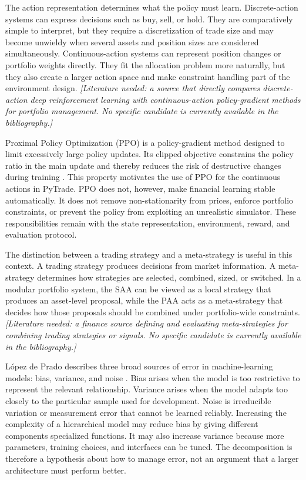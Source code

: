 The action representation determines what the policy must learn. Discrete-action systems can express decisions such as buy, sell, or hold. They are comparatively simple to interpret, but they require a discretization of trade size and may become unwieldy when several assets and position sizes are considered simultaneously. Continuous-action systems can represent position changes or portfolio weights directly. They fit the allocation problem more naturally, but they also create a larger action space and make constraint handling part of the environment design. \textit{[Literature needed: a source that directly compares discrete-action deep reinforcement learning with continuous-action policy-gradient methods for portfolio management. No specific candidate is currently available in the bibliography.]}

Proximal Policy Optimization (PPO) is a policy-gradient method designed to limit excessively large policy updates. Its clipped objective constrains the policy ratio in the main update and thereby reduces the risk of destructive changes during training \cite{JohnSchulmanFilipWolskiPrafullaDhariwalAlecRadfordOlegKlimov.2017}. This property motivates the use of PPO for the continuous actions in PyTrade. PPO does not, however, make financial learning stable automatically. It does not remove non-stationarity from prices, enforce portfolio constraints, or prevent the policy from exploiting an unrealistic simulator. These responsibilities remain with the state representation, environment, reward, and evaluation protocol.

The distinction between a trading strategy and a meta-strategy is useful in this context. A trading strategy produces decisions from market information. A meta-strategy determines how strategies are selected, combined, sized, or switched. In a modular portfolio system, the SAA can be viewed as a local strategy that produces an asset-level proposal, while the PAA acts as a meta-strategy that decides how those proposals should be combined under portfolio-wide constraints. \textit{[Literature needed: a finance source defining and evaluating meta-strategies for combining trading strategies or signals. No specific candidate is currently available in the bibliography.]}

López de Prado describes three broad sources of error in machine-learning models: bias, variance, and noise \cite{LopezdePrado.2018}. Bias arises when the model is too restrictive to represent the relevant relationship. Variance arises when the model adapts too closely to the particular sample used for development. Noise is irreducible variation or measurement error that cannot be learned reliably. Increasing the complexity of a hierarchical model may reduce bias by giving different components specialized functions. It may also increase variance because more parameters, training choices, and interfaces can be tuned. The decomposition is therefore a hypothesis about how to manage error, not an argument that a larger architecture must perform better.

